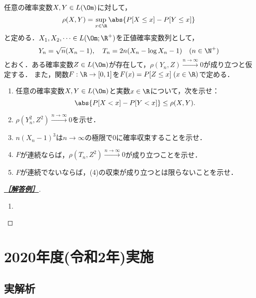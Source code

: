 \documentclass[uplatex,dvipdfmx]{jsarticle}
\begin{document}
\begin{tcolorbox}[colframe=ForestGreen, colback=ForestGreen!10!white,breakable,colbacktitle=ForestGreen!40!white,coltitle=black,fonttitle=\bfseries\sffamily,
    title=B 第18問（確率論）]
    任意の確率変数$X,Y\in L(\Om)$に対して，
    \[\rho(X,Y)=\sup_{x\in\R}\abs{P[X\le x]-P[Y\le x]}\]
    と定める．$X_1,X_2,\cdots\in L(\Om;\R^+)$を正値確率変数列として，
    \[Y_n=\sqrt{n}(X_n-1),\quad T_n=2n(X_n-\log X_n-1)\quad(n\in\N^+)\]
    とおく．ある確率変数$Z\in L(\Om)$が存在して，$\rho(Y_n,Z)\xrightarrow{n\to\infty}0$が成り立つと仮定する．
    また，関数$F:\R\to[0,1]$を$F(x)=P[Z\le x]\;(x\in\R)$で定める．
    \begin{enumerate}
        \item 任意の確率変数$X,Y\in L(\Om)$と実数$x\in\R$について，次を示せ：
        \[\abs{P[X<x]-P[Y<x]}\le\rho(X,Y).\]
        \item $\rho(Y_n^2,Z^2)\xrightarrow{n\to\infty}0$を示せ．
        \item $n(X_n-1)^3$は$n\to\infty$の極限で$0$に確率収束することを示せ．
        \item $F$が連続ならば，$\rho(T_n,Z^2)\xrightarrow{n\to\infty}0$が成り立つことを示せ．
        \item $F$が連続でないならば，(4)の収束が成り立つとは限らないことを示せ．
    \end{enumerate}
\end{tcolorbox}
\begin{proof}[\textbf{\underline{［解答例］}}]\mbox{}
    \begin{enumerate}
        \item 
    \end{enumerate}
\end{proof}

\section{2020年度(令和2年)実施}

\subsection{実解析}
\end{document}
